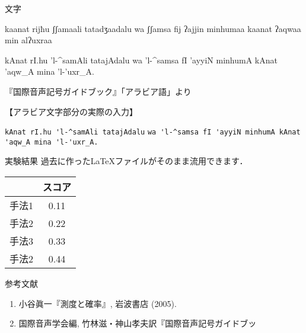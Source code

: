 \documentclass[unicode,colorlinks]{beamer}
\begin{document}
\begin{frame}[fragile]
\begin{columns}[t]
\begin{column}{.32\linewidth}
\begin{block}{文字}
            \bigskip
            \bigskip


            \begin{ipafont}
                kaanat rijħu ʃʃamaali tatadʒaadalu wa ʃʃamsa fij ʔajjin minhumaa kaanat ʔaqwaa min alʔuxraa
            \end{ipafont}

            \bigskip
            \bigskip

            \begin{arab}[fullvoc]
                kAnat rI.hu 'l-^samAli tatajAdalu wa 'l-^samsa fI 'ayyiN minhumA kAnat 'aqw_A mina 'l-'uxr_A.
            \end{arab}

            \bigskip
            \bigskip

            \hfill {\small 『国際音声記号ガイドブック』「アラビア語」より}

            \bigskip
            \bigskip

            【アラビア文字部分の実際の入力】

            \verb+kAnat rI.hu 'l-^samAli tatajAdalu+
            \verb+wa 'l-^samsa fI 'ayyiN minhumA kAnat+
            \verb+'aqw_A mina 'l-'uxr_A.+
        \end{block}

        \begin{block}{実験結果}
            過去に作った\LaTeX ファイルがそのまま流用できます．

            \bigskip
            \bigskip

            \begin{center}
                \begin{tabularx}{0.5\textwidth}{CC}
                    \toprule
                             & スコア \\
                    \midrule
                    手法1    & 0.11   \\
                    手法2    & 0.22   \\
                    手法3    & 0.33   \\
                    手法2    & 0.44   \\
                    \bottomrule
                \end{tabularx}
            \end{center}
        \end{block}


        \begin{block}{参考文献}
            \begin{enumerate}
                \item 小谷眞一『測度と確率』, 岩波書店 (2005).
                \item 国際音声学会編, 竹林滋・神山孝夫訳『国際音声記号ガイドブッ


\end{enumerate}
\end{block}
\end{column}
\end{columns}
\end{frame}
\end{document}
